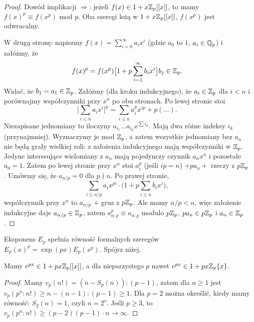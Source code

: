 \begin{proof}
	Dowód implikacji $\Rightarrow$: jeżeli $f(x) \in 1 + x \mathbb Z_p[[x]]$, to mamy $f(x)^p \equiv f(x^p)$ mod $p$.
	Oba szeregi leżą w $1+ x \mathbb Z_p[[x]]$, $f(x^p)$ jest odwracalny.

	W drugą stronę: napiszmy $f(x) = \sum_{i=0}^\infty a_i x^i$ (gdzie $a_0$  to $1$, $a_i \in \mathbb Q_p$) i załóżmy, że
	\[
		f(x)^p = f(x^p) \big[1 + p \sum_{i=1}^\infty b_i x^i \big] \hfill b_j \in \Z_p.
	\]
	Widać, że $b_1 = a_1 \in \mathbb Z_p$.
	Załóżmy (dla kroku indukcyjnego), że $a_i \in \mathbb Z_p$ dla $i < n$ i porównajmy współczynniki przy $x^n$ po obu stronach.
	Po lewej stronie stoi
	\[
		\Big[\sum_{i \le n} a_i x^i \Big]^p = \sum_{i \le n} a_i^p x^{ip} + p (\dots).
	\]
	Niezapisane jednomiany to iloczyny $a_{i_1} \dots a_{i_p} x^{\sum i_k}$.
	Mają dwa różne indeksy $i_k$ (przynajmniej).
	Wyznaczymy je mod $ \mathbb Z_p$, a zatem wszystkie jednomiany bez $a_n$ nie będą grały wielkiej roli: z założenia indukcyjnego mają współczynniki w $\mathbb Z_p$.
	Jedyne interesujące wielomiany z $a_n$ mają pojedynczy czynnik $a_n x^n$ i pozostałe $a_0 = 1$.
	Zatem po lewej stronie przy $x^n$ stoi $a_i^p$ (jeśli $ip = n$) $+ pa_n + $ rzeczy z $p\mathbb Z_p$.
	Umówmy się, że $a_{n/p} = 0$ dla $p \nmid n$.
	Po prawej stronie,
	\[
		\sum_{i \le n/p} a_i x^{pi} \cdot \Big( 1 + p \sum_{i \le n} b_i x^i\Big),
	\]
	współczynnik przy $x^n$ to $a_{n/p}$ + gruz z $p\mathbb Z_p$.
	Ale mamy $n/p < n$, więc założenie indukcyjne  daje $a_{n/p} \in \mathbb Z_p$, zatem $a_{n:p}^p \equiv a_{n:p}$ modulo $p\mathbb Z_p$, $pa_n \in p\mathbb Z_p$ i $a_n \in \mathbb Z_p$.
\end{proof}

\begin{przyklad}
	Eksponens $E_p$ spełnia równość formalnych szeregów $E_p(x)^p = \exp(px) E_p(x^p)$.
	Spójrz niżej.
\end{przyklad}

\begin{fakt}
	Mamy $e^{px} \in 1 + px \mathbb Z_p[[x]]$, a dla nieparzystego $p$ nawet $e^{px} \in 1 + px \mathbb Z_p \{x\}$.
\end{fakt}

\begin{proof}
	Mamy $v_p(n!) = (n - S_p(n)) : (p-1)$, zatem dla $n \ge 1$ jest $v_p(p^n:n!) \ge n - (n-1):(p-1)\ge 1$.
	Dla $p = 2$ można określić, kiedy mamy równość: $S_2(n) = 1$, czyli $n = 2^v$.
	Jeśli $p \ge 3$, to $v_p(p^n:n!) \ge (p-2)(p-1) \cdot n \to \infty$.
\end{proof}